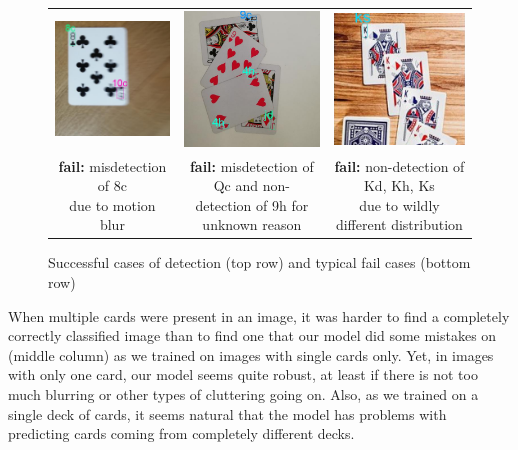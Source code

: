 \documentclass[a4paper]{article}
\begin{document}
\begin{figure}[h]
\begin{tabular}{ccc}
  \includegraphics[width=44mm]{images/fail1} &   \includegraphics[width=44mm]{images/fail2} &   \includegraphics[width=44mm]{images/fail3}\\
\makecell{\textbf{fail:}  misdetection of 8c \\ due to motion blur} & \makecell{\textbf{fail:} misdetection of Qc and non- \\detection of 9h for unknown reason} & \makecell{\textbf{fail:} non-detection of Kd, Kh, Ks \\ due to wildly different distribution} \\[6pt]



\end{tabular}
\caption{Successful cases of detection (top row) and typical fail cases (bottom row) }
\end{figure}
When multiple cards were present in an image, it was harder to find a completely correctly classified image than to find one that our model did some mistakes on (middle column) as we trained on images with single cards only. Yet, in images with only one card, our model seems quite robust, at least if there is not too much blurring or other types of cluttering going on. Also, as we trained on a single deck of cards, it seems natural that the model has problems with predicting cards coming from completely different decks.
\end{document}
